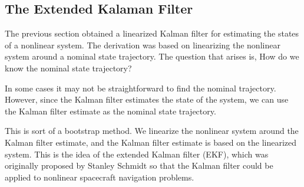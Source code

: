 \subsection{The Extended Kalaman Filter }

The previous section obtained a linearized Kalman filter for estimating the states of 
a nonlinear system.  The derivation was based on linearizing the nonlinear system 
around a nominal state trajectory.  The question that arises is, How do we know 
the nominal state trajectory? 

In some cases it may not be straightforward to find 
the nominal trajectory.  However, since the Kalman  filter estimates the state of 
the system, we can use the Kalman filter estimate as the nominal state trajectory.

This is sort of a bootstrap method.  We linearize the nonlinear system around the 
Kalman filter estimate, and the Kalman filter estimate is based on the linearized 
system. This is the idea of the extended Kalman filter (EKF), which was originally 
proposed by Stanley Schmidt so that the Kalman filter could be applied to nonlinear 
spacecraft navigation problems.
